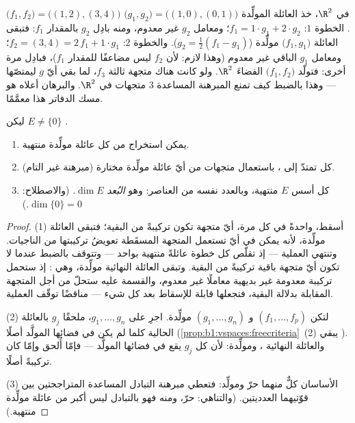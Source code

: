 \begin{example}
\label{ex:b1:findim:exchangerun}
في $\R^2$، خذ العائلة المولِّدة $\bigl(g_1, g_2\bigr) =
\bigl((1,0), (0,1)\bigr)$  $\bigl(f_1,
f_2\bigr) = \bigl((1,2), (3,4)\bigr)$. الخطوة $1$: $f_1 = 1\cdot
g_1 + 2\cdot g_2$؛ ومعامل $g_2$ غير معدوم، ومنه
بادِل $g_2$ بالمقدار $f_1$: فتبقى العائلة $\bigl(f_1, g_1\bigr)$
مولِّدة ($g_2 = \frac12(f_1 - g_1)$). والخطوة $2$: $f_2 =
(3,4) = 2\,f_1 + 1\cdot g_1$؛ ومعامل $g_1$ الباقي
غير معدوم (وهذا لازم: لأن $f_2$ ليس مضاعفًا للمقدار $f_1$)،
فبادِل مرة أخرى: فتولّد $\bigl(f_1, f_2\bigr)$ الفضاءَ $\R^2$. ولو
كانت هناك متجهة  ثالثة $f_3$، لما بقي أيّ $g$ ليمتصّها
--- وهذا بالضبط كيف تمنع المبرهنة المساعدة $3$ متجهات 
في $\R^2$. والبرهان أعلاه هو مسك الدفاتر هذا معمَّمًا.
\end{example}

\begin{theorem}\label{thm:b1:findim:bases}
ليكن $E \neq \{0\}$ .
\begin{enumerate}
  \item يمكن استخراج  من كل عائلة مولِّدة منتهية.
  \item (مبرهنة  غير التام)
        كل  تمتدّ إلى ، باستعمال متجهات من أيّ
        عائلة مولِّدة مختارة.
  \item كل أسس $E$ منتهية، وبالعدد نفسه من
        العناصر: وهو \emph{البُعد} $\dim E$. (والاصطلاح:
        $\dim\{0\} = 0$.)
\end{enumerate}
\end{theorem}

\begin{proof}
(1) أسقط، واحدةً في كل مرة، أيّ متجهة تكون تركيبةً من
البقية؛ فتبقى العائلة مولِّدة، لأنه يمكن في أيّ 
تستعمل المتجهة المسقَطة تعويضُ تركيبتها من
الناجيات. وتنتهي العملية --- إذ تقلّص كل خطوة عائلةً
منتهية بواحد --- وتتوقف بالضبط عندما لا تكون أيّ متجهة
باقية تركيبةً من البقية. وتبقى العائلة النهائية
مولِّدة، وهي : إذ ستحمل تركيبة معدومة غير بديهية
معاملًا غير معدوم، والقسمة عليه ستحلّ
من أجل المتجهة المقابلة بدلالة البقية، فتجعلها
قابلة للإسقاط بعد كل شيء --- مناقضًا توقّف العملية.

(2) لتكن $(f_1, \dots, f_p)$  و $(g_1, \dots, g_n)$ مولِّدة.
اجرِ على $g_1, \dots, g_n$، ملحقًا $g_j$ بالعائلة الحالية
كلما لم يكن في فضائها المولَّد أصلًا
(\cref{prop:b1:vspaces:freecriteria}~(2) يبقي ).
والعائلة النهائية ، ومولِّدة: لأن كل $g_j$ يقع في
فضائها المولَّد --- فإمّا أُلحق وإمّا كان تركيبةً أصلًا.

(3) الأساسان كلٌّ منهما حرّ ومولِّد: فتعطي مبرهنة التبادل المساعدة
المتراجحتين بين قوّتيهما العدديتين. (والتناهي:
 حرّ، ومنه فهو بالتبادل ليس أكبر من عائلة مولِّدة
منتهية.)
\end{proof}

